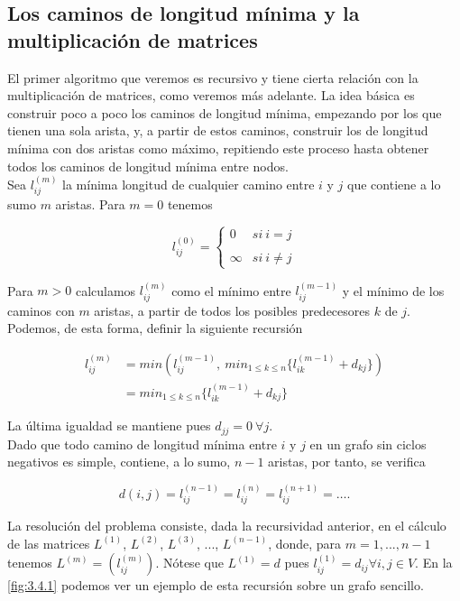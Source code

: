 \subsection{Los caminos de longitud mínima y la multiplicación de matrices}\label{sec:3.4.1}

El primer algoritmo que veremos es recursivo y tiene cierta relación con la multiplicación de matrices, como veremos más adelante. La idea básica es construir poco a poco los caminos de longitud mínima, empezando por los que tienen una sola arista, y, a partir de estos caminos, construir los de longitud mínima con dos aristas como máximo, repitiendo este proceso hasta obtener todos los caminos de longitud mínima entre nodos. \\

Sea $l_{ij}^{(m)}$ la mínima longitud de cualquier camino entre $i$ y $j$ que contiene a lo sumo $m$ aristas. Para $m=0$ tenemos 

$$l_{ij}^{(0)}= \left\{ \begin{array}{lcc}
	0 &   si\ i=j \\
	\\ \infty & si\ i\neq j
\end{array}
\right.$$

Para $m>0$ calculamos $l_{ij}^{(m)}$ como el mínimo entre $l_{ij}^{(m-1)}$ y el mínimo de los caminos con $m$ aristas, a partir de todos los posibles predecesores $k$ de $j$. Podemos, de esta forma, definir la siguiente recursión

\begin{align*}
	l_{ij}^{(m)} & =min(l_{ij}^{(m-1)},\ min_{1\leq k\leq n}\{l_{ik}^{(m-1)}+d_{kj}\}) \\
	& =min_{1\leq k\leq n}\{l_{ik}^{(m-1)}+d_{kj}\}
\end{align*}

La última igualdad se mantiene pues $d_{jj}=0\ \forall j$. \\

Dado que todo camino de longitud mínima entre $i$ y $j$ en un grafo sin ciclos negativos es simple, contiene, a lo sumo, $n-1$ aristas, por tanto, se verifica

$$d(i,j)=l_{ij}^{(n-1)}=l_{ij}^{(n)}=l_{ij}^{(n+1)}=\dots.$$

La resolución del problema consiste, dada la recursividad anterior, en el cálculo de las matrices $L^{(1)}$, $L^{(2)}$, $L^{(3)}$, ..., $L^{(n-1)}$, donde, para $m=1,...,n-1$ tenemos $L^{(m)}=(l_{ij}^{(m)})$. Nótese que $L^{(1)}=d$ pues $l_{ij}^{(1)}=d_{ij}\forall i,j\in V$. En la \autoref{fig:3.4.1} podemos ver un ejemplo de esta recursión sobre un grafo sencillo.\\

